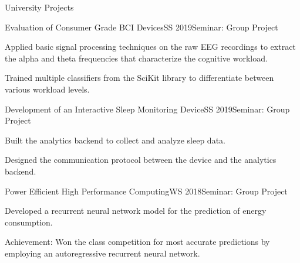 \documentclass{resume} %
\begin{document}
\begin{rSection}{University Projects}
\begin{rSubsection}{Evaluation of Consumer Grade BCI Devices}{SS 2019}{Seminar: Group Project}{}
\item Applied basic signal processing techniques on the raw EEG recordings to extract the alpha and theta frequencies that characterize the cognitive workload.
\item Trained multiple classifiers from the SciKit library to differentiate between various workload levels.
\end{rSubsection}

\begin{rSubsection}{Development of an Interactive Sleep Monitoring Device}{SS 2019}{Seminar: Group Project}{}
\item Built the analytics backend to collect and analyze sleep data.
\item Designed the communication protocol between the device and the analytics backend.
\end{rSubsection}

\begin{rSubsection}{Power Efficient High Performance Computing}{WS 2018}{Seminar: Group Project}{}
\item Developed a recurrent neural network model for the prediction of energy consumption.
\item Achievement: Won the class competition for most accurate predictions by employing an autoregressive recurrent neural network.
\end{rSubsection}


\end{rSection}
\end{document}
